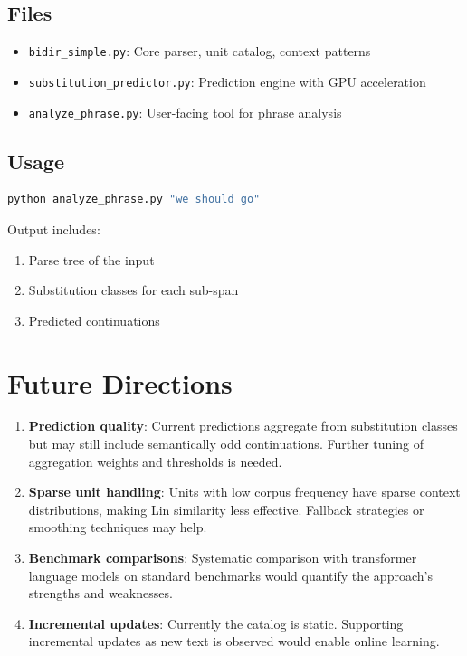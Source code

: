 \documentclass[11pt,a4paper]{article}
\begin{document}
\subsection{Files}

\begin{itemize}
    \item \texttt{bidir\_simple.py}: Core parser, unit catalog, context patterns
    \item \texttt{substitution\_predictor.py}: Prediction engine with GPU acceleration
    \item \texttt{analyze\_phrase.py}: User-facing tool for phrase analysis
\end{itemize}

\subsection{Usage}

\begin{lstlisting}[language=bash]
python analyze_phrase.py "we should go"
\end{lstlisting}

Output includes:
\begin{enumerate}
    \item Parse tree of the input
    \item Substitution classes for each sub-span
    \item Predicted continuations
\end{enumerate}

\section{Future Directions}

\begin{enumerate}
    \item \textbf{Prediction quality}: Current predictions aggregate from substitution classes but may still include semantically odd continuations. Further tuning of aggregation weights and thresholds is needed.

    \item \textbf{Sparse unit handling}: Units with low corpus frequency have sparse context distributions, making Lin similarity less effective. Fallback strategies or smoothing techniques may help.

    \item \textbf{Benchmark comparisons}: Systematic comparison with transformer language models on standard benchmarks would quantify the approach's strengths and weaknesses.

    \item \textbf{Incremental updates}: Currently the catalog is static. Supporting incremental updates as new text is observed would enable online learning.
\end{enumerate}
\end{document}

